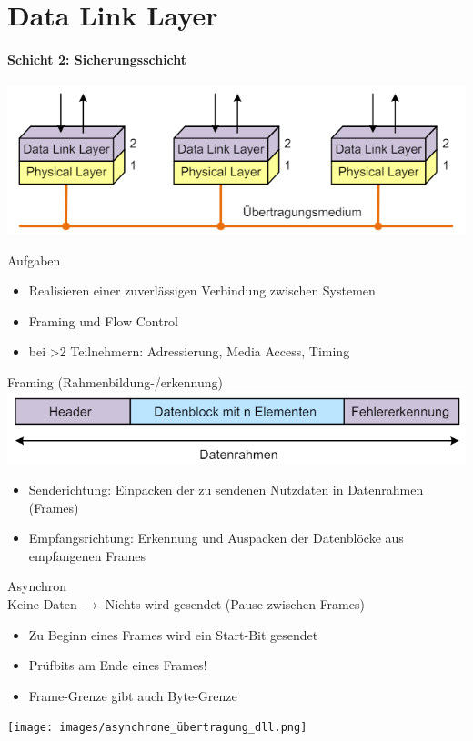 \section{Data Link Layer}
\paragraph{Schicht 2: Sicherungsschicht}
\includegraphics[width=0.5\linewidth]{images/data_link_layer.png}
\begin{definition}{Aufgaben}
    \begin{itemize}
        \item Realisieren einer zuverlässigen Verbindung zwischen Systemen
        \item Framing und Flow Control
        \item bei >2 Teilnehmern: Adressierung, Media Access, Timing
    \end{itemize}
\end{definition}

\begin{definition}{Framing (Rahmenbildung-/erkennung)}\\
    \includegraphics[width=0.6\linewidth]{images/frame_def.png}
    \begin{itemize}
        \item Senderichtung: Einpacken der zu sendenen Nutzdaten in Datenrahmen (Frames)
        \item Empfangsrichtung: Erkennung und Auspacken der Datenblöcke aus empfangenen Frames
    \end{itemize}
\end{definition}

\begin{concept}{Asynchron}\\
    Keine Daten $\rightarrow$ Nichts wird gesendet (Pause zwischen Frames)
    \begin{itemize}
        \item Zu Beginn eines Frames wird ein Start-Bit gesendet
        \item Prüfbits am Ende eines Frames!
        \item Frame-Grenze gibt auch Byte-Grenze
    \end{itemize}
    \texttt{[image: images/asynchrone\_übertragung\_dll.png]}
\end{concept}

